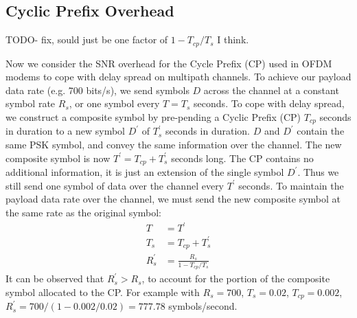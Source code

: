 \documentclass{article}
\begin{document}
\subsection{Cyclic Prefix Overhead}

TODO- fix, sould just be one factor of $1 - T_{cp}/T_s$ I think.

Now we consider the SNR overhead for the Cycle Prefix (CP) used in OFDM modems to cope with delay spread on multipath channels.  To achieve our payload data rate (e.g. 700 bits/s), we send symbols $D$ across the channel at a constant symbol rate $R_s$, or one symbol every $T=T_s$ seconds.  To cope with delay spread, we construct a composite symbol by pre-pending a Cyclic Prefix (CP) $T_{cp}$ seconds in duration to a new symbol $D^\prime$ of $T^\prime_s$ seconds in duration.  $D$ and $D^\prime$ contain the same PSK symbol, and convey the same information over the channel. The new composite symbol is now $T^\prime = T_{cp}+T^\prime_s$ seconds long.  The CP contains no additional information, it is just an extension of the single symbol $D^\prime$. Thus we still send one symbol of data over the channel every $T^\prime$ seconds.  To maintain the payload data rate over the channel, we must send the new composite symbol at the same rate as the original symbol:
\begin{equation}
\begin{split}
T &= T^\prime \\
T_s &= T_{cp} + T^\prime_s \\
R^\prime_s &= \frac{R_s}{1 - T_{cp}/T_s}
\end{split}
\end{equation}
It can be observed that $R^\prime_s > R_s$, to account for the portion of the composite symbol allocated to the CP.  For example with $R_s=700$, $T_s=0.02$, $T_{cp}=0.002$, $R^\prime_s=700/(1-0.002/0.02)=777.78$ symbols/second.
\end{document}
